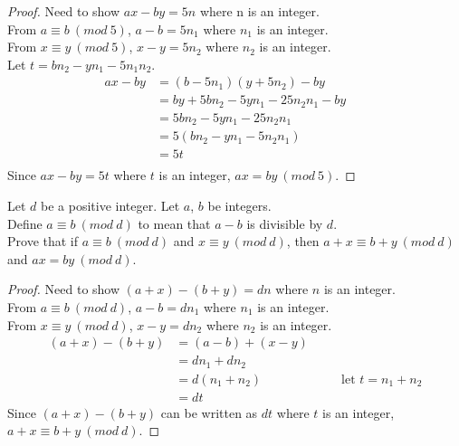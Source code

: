 \documentclass[6pt]{article}
\begin{document}
\begin{proof} 
Need to show $ax - by = 5n$ where n is an integer. \\
From $a \equiv b\ (mod\ 5)$, $a - b = 5n_1$ where $n_1$ is an integer. \\
From $x \equiv y\ (mod\ 5)$, $x - y = 5n_2$ where $n_2$ is an integer. \\
Let $t = bn_2 - yn_1 -5n_1n_2$.
\begin{align*}
ax - by &= (b - 5n_1)(y + 5n_2) - by && \\
&= by + 5bn_2 - 5yn_1 -25n_2n_1 - by && \\
&= 5bn_2 - 5yn_1 -25n_2n_1 && \\
&= 5(bn_2 - yn_1 -5n_2n_1) && \\
&= 5t && \\
\end{align*}
Since $ax - by = 5t$ where $t$ is an integer, $ax = by\ (mod\ 5)$.
\end{proof}


\begin{tcolorbox}[title=Problem 25, breakable]
Let $d$ be a positive integer. Let $a$, $b$ be integers. \\
Define $a \equiv b\ (mod\ d)$ to mean that $a - b$ is divisible by $d$. \\
Prove that if $a \equiv b\ (mod\ d)$ and $x \equiv y\ (mod\ d)$, then 
$a + x \equiv b + y\ (mod\ d)$ and $ax = by\ (mod\ d)$.
\end{tcolorbox}

\begin{proof}
Need to show $(a + x) - (b + y) = dn$ where $n$ is an integer. \\
From $a \equiv b\ (mod\ d)$, $a - b = dn_1$ where $n_1$ is an integer. \\
From $x \equiv y\ (mod\ d)$, $x - y = dn_2$ where $n_2$ is an integer.
\begin{align*}
(a + x) - (b + y) &= (a - b) + (x - y) && \\
&= dn_1 + dn_2 && \\
&= d(n_1 + n_2) && \quad \text{let $t = n_1 + n_2$} \\
&= dt &&
\end{align*}
Since $(a + x) - (b + y)$ can be written as $dt$ where $t$ is an integer, $a + x \equiv b + y\ (mod\ d)$. 
\end{proof}
\end{document}
